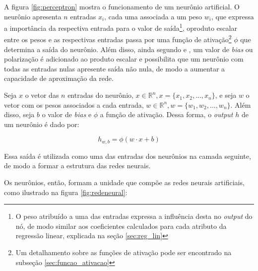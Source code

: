 A figura \ref{fig:perceptron} mostra o funcionamento de 
um neurônio artificial. O neurônio apresenta $n$ entradas 
$x_i$, cada uma associada a um peso $w_i$, que expressa 
a importância da respectiva entrada para o valor de saída\footnote{ 
O peso atribuído a uma das entradas expressa a influência
desta no \textit{output} do nó, de modo similar aos coeficientes calculados 
para cada atributo da regressão linear, explicada na seção \ref{sec:reg_lin}},
oproduto escalar entre os pesos e as respectivas entradas
 passa por uma função de 
ativação\footnote{Um detalhamento sobre as funções de 
ativação pode ser encontrado na subseção \ref{sec:funcao_ativacao}} 
$\phi$ que determina a saída do neurônio. 
Além disso, ainda segundo \citet{deeplearningbook} e \citet{dl-oreilly}, um valor de \textit{bias} ou polarização é
adicionado ao produto escalar e possibilita que 
um neurônio com todas as entradas nulas
apresente saída não nula, de modo a
aumentar a capacidade de aproximação da rede. 



Seja $x$ o vetor das $n$ entradas do neurônio,
$x \in \mathbb{R}^n, x=\{x_1, x_2, ..., x_n\}$, e seja 
$w$ o vetor com os pesos associados a cada entrada, 
$w \in \mathbb{R}^n, w=\{w_1, w_2, ..., w_n\}$. Além disso,
seja $b$ o valor de \textit{bias} e $\phi$ a função de ativação.
Dessa forma, o \textit{output} $h$ de um neurônio é dado por:
 
\begin{equation}
  h_{w,b} = \phi(w \cdot x + b)
\end{equation}

Essa saída é utilizada como uma das entradas dos neurônios
na camada seguinte, de modo a formar a estrutura das redes 
neurais. 

Os neurônios,
então, formam a unidade que compõe as redes neurais artificiais,
como ilustrado na figura \ref{fig:redeneural}:

